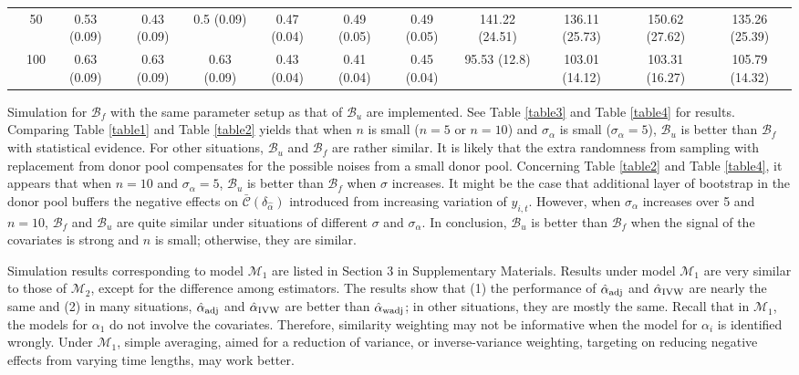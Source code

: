 \documentclass[11pt]{article}
\def\mc#1{\mathcal{#1}} %
\theoremstyle{definition}
\begin{document}
\begin{table}[H]
\begin{center}
{\begin{tabular}{cc|ccc|ccc|cccc|}
  & 50  & 0.53 (0.09) & 0.43 (0.09) & 0.5 (0.09) & 0.47 (0.04) & 0.49 (0.05) & 0.49 (0.05) & 141.22 (24.51) & 136.11 (25.73) & 150.62 (27.62) & 135.26 (25.39) \\ 
  & 100  & 0.63 (0.09) & 0.63 (0.09) & 0.63 (0.09) & 0.43 (0.04) & 0.41 (0.04) & 0.45 (0.04) & 95.53 (12.8) & 103.01 (14.12) & 103.31 (16.27) & 105.79 (14.32) \\
\end{tabular}}
   \end{center}
      \vspace{-.5cm}
\end{table}


Simulation for $\mc{B}_f$ with the same parameter setup as that of $\mc{B}_u$ are implemented. See Table \ref{table3} and Table \ref{table4} for results. Comparing Table \ref{table1}
 and Table \ref{table2} yields that when $n$ is small ($n = 5$ or $n = 10$) and $\sigma_{\alpha}$ is small ($\sigma_{\alpha}=5$), $\mc{B}_u$ is better than $\mc{B}_f$ with statistical evidence. For other situations, $\mc{B}_u$  and $\mc{B}_f$  are rather similar. It is likely that the extra randomness from sampling with replacement from donor pool compensates for the possible noises from a small donor pool. Concerning  Table \ref{table2} and Table \ref{table4}, it appears that when $n = 10$ and $\sigma_{\alpha}=5$, $\mc{B}_u$ is better than  $\mc{B}_f$  when $\sigma$ increases. It might be the case that additional layer of bootstrap in the donor pool buffers the negative effects on $\bar{\mc{C}}(\delta_{\hat{\alpha}})$  introduced from increasing variation of $y_{i,t}$. However, when $\sigma_{\alpha}$ increases over 5 and $n = 10$,  $\mc{B}_f$ and $\mc{B}_u$ are quite similar under  situations of different $\sigma$ and $\sigma_{\alpha}$. In conclusion, $\mc{B}_u$ is better than $\mc{B}_f$ when the signal of the covariates is strong and $n$ is small; otherwise, they are similar. %
 
 
 Simulation results corresponding to model $\mc{M}_1$ are listed in Section 3 in Supplementary Materials. Results under model $\mc{M}_1$ are very similar to those of $\mc{M}_2$, except for the difference among estimators. The results show that (1) the performance of $\hat{\alpha}_{\rm adj}$ and  $\hat{\alpha}_{\rm IVW}$ are nearly the same and (2) in many situations, $\hat{\alpha}_{\rm adj}$ and  $\hat{\alpha}_{\rm IVW}$ are  better than $\hat{\alpha}_{\rm wadj}$; in other situations, they are mostly the same. Recall that in $\mc{M}_1$, the models for $\alpha_1$ do not involve the covariates. Therefore, similarity weighting may not be informative when the model for $\alpha_i$ is identified wrongly. Under $\mc{M}_1$, simple averaging, aimed for a reduction of variance, or inverse-variance weighting, targeting on reducing negative effects from varying time lengths, may work better.
\end{document}

